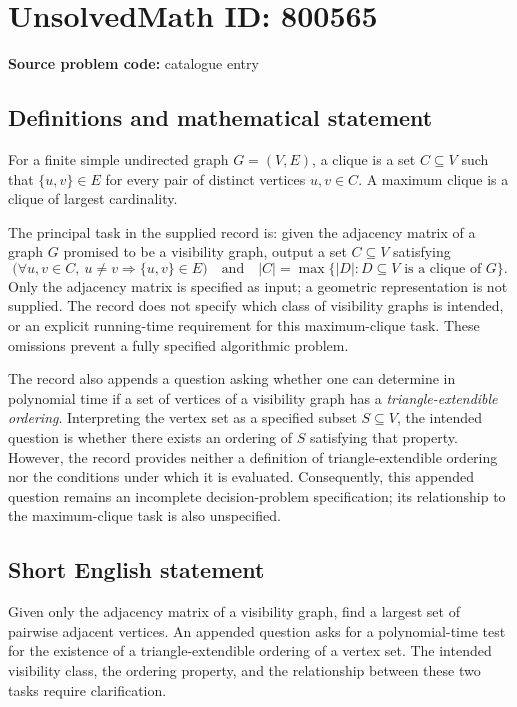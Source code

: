 \documentclass[11pt]{article}
\begin{document}
\section*{UnsolvedMath ID: 800565}
\textbf{Source problem code:} catalogue entry
\subsection{Definitions and mathematical statement}
For a finite simple undirected graph \(G=(V,E)\), a clique is a set \(C\subseteq V\) such that \(\{u,v\}\in E\) for every pair of distinct vertices \(u,v\in C\). A maximum clique is a clique of largest cardinality.

The principal task in the supplied record is: given the adjacency matrix of a graph \(G\) promised to be a visibility graph, output a set \(C\subseteq V\) satisfying
\[
\bigl(\forall u,v\in C,\ u\ne v\Longrightarrow \{u,v\}\in E\bigr)
\quad\text{and}\quad
|C|=\max\bigl\{|D|:D\subseteq V\text{ is a clique of }G\bigr\}.
\]
Only the adjacency matrix is specified as input; a geometric representation is not supplied. The record does not specify which class of visibility graphs is intended, or an explicit running-time requirement for this maximum-clique task. These omissions prevent a fully specified algorithmic problem.

The record also appends a question asking whether one can determine in polynomial time if a set of vertices of a visibility graph has a \emph{triangle-extendible ordering}. Interpreting the vertex set as a specified subset \(S\subseteq V\), the intended question is whether there exists an ordering of \(S\) satisfying that property. However, the record provides neither a definition of triangle-extendible ordering nor the conditions under which it is evaluated. Consequently, this appended question remains an incomplete decision-problem specification; its relationship to the maximum-clique task is also unspecified.
\subsection{Short English statement}
Given only the adjacency matrix of a visibility graph, find a largest set of pairwise adjacent vertices. An appended question asks for a polynomial-time test for the existence of a triangle-extendible ordering of a vertex set. The intended visibility class, the ordering property, and the relationship between these two tasks require clarification.
\end{document}
